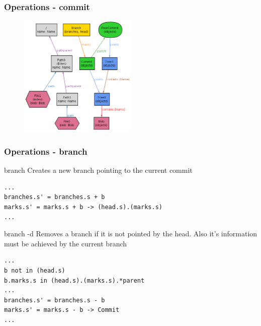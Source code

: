 \documentclass{beamer}
\begin{document}
\begin{frame}[fragile]
   \frametitle{Operations - commit}
   \begin{figure}
      \centering
      \includegraphics[width=0.5\textwidth]{images/commit2.png}
   \end{figure}
\end{frame}

\begin{frame}[fragile]
   \frametitle{Operations - branch}
   \begin{block}{branch}
      Creates a new branch pointing to the current commit
   \end{block}
   \tiny
   \begin{lstlisting}
...
branches.s' = branches.s + b
marks.s' = marks.s + b -> (head.s).(marks.s)
...
   \end{lstlisting}
   \normalsize
   \begin{block}{branch -d}
      Removes a branch if it is not pointed by the head.
      Also it's information must be achieved by the 
      current branch
   \end{block}
   \tiny
   \begin{lstlisting}
...
b not in (head.s)
b.marks.s in (head.s).(marks.s).*parent
...
branches.s' = branches.s - b
marks.s' = marks.s - b -> Commit
...
   \end{lstlisting}
\end{frame}
\end{document}
